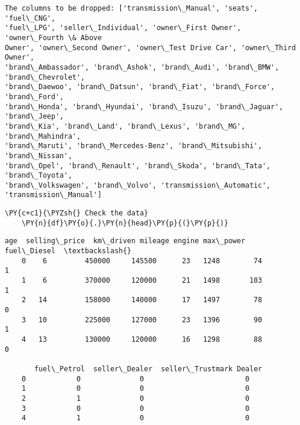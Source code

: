 \begin{Verbatim}[commandchars=\\\{\}]
The columns to be dropped: ['transmission\_Manual', 'seats', 'fuel\_CNG',
'fuel\_LPG', 'seller\_Individual', 'owner\_First Owner', 'owner\_Fourth \& Above
Owner', 'owner\_Second Owner', 'owner\_Test Drive Car', 'owner\_Third Owner',
'brand\_Ambassador', 'brand\_Ashok', 'brand\_Audi', 'brand\_BMW', 'brand\_Chevrolet',
'brand\_Daewoo', 'brand\_Datsun', 'brand\_Fiat', 'brand\_Force', 'brand\_Ford',
'brand\_Honda', 'brand\_Hyundai', 'brand\_Isuzu', 'brand\_Jaguar', 'brand\_Jeep',
'brand\_Kia', 'brand\_Land', 'brand\_Lexus', 'brand\_MG', 'brand\_Mahindra',
'brand\_Maruti', 'brand\_Mercedes-Benz', 'brand\_Mitsubishi', 'brand\_Nissan',
'brand\_Opel', 'brand\_Renault', 'brand\_Skoda', 'brand\_Tata', 'brand\_Toyota',
'brand\_Volkswagen', 'brand\_Volvo', 'transmission\_Automatic',
'transmission\_Manual']
\end{Verbatim}
\begin{tcolorbox}[breakable, size=fbox, boxrule=1pt, pad at break*=1mm,colback=cellbackground, colframe=cellborder]
    \begin{Verbatim}[commandchars=\\\{\}]
    \PY{c+c1}{\PYZsh{} Check the data}
    \PY{n}{df}\PY{o}{.}\PY{n}{head}\PY{p}{(}\PY{p}{)}
    \end{Verbatim}
    \end{tcolorbox}
    
                \begin{tcolorbox}[breakable, size=fbox, boxrule=.5pt, pad at break*=1mm, opacityfill=0]
    \begin{Verbatim}[commandchars=\\\{\}]
       age  selling\_price  km\_driven mileage engine max\_power  fuel\_Diesel  \textbackslash{}
    0    6         450000     145500      23   1248        74            1
    1    6         370000     120000      21   1498       103            1
    2   14         158000     140000      17   1497        78            0
    3   10         225000     127000      23   1396        90            1
    4   13         130000     120000      16   1298        88            0
    
       fuel\_Petrol  seller\_Dealer  seller\_Trustmark Dealer
    0            0              0                        0
    1            0              0                        0
    2            1              0                        0
    3            0              0                        0
    4            1              0                        0
    \end{Verbatim}
    \end{tcolorbox}


